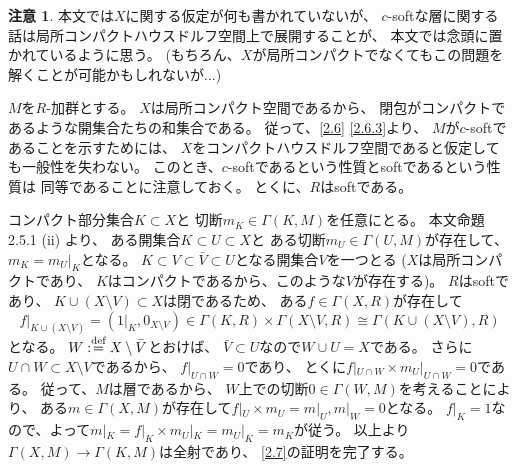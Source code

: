 \documentclass[uplatex,dvipdfmx]{jsarticle}
\makeatletter
\theoremstyle{definition}
\newtheorem*{rem*}{注意}
\renewenvironment{proof}[1][\proofname]{
  \pushQED{\qed}%
  \normalfont \topsep6\p@\@plus6\p@\relax
  \trivlist
  \item[\hskip\labelsep
    #1\@addpunct{\textbf{.}}]\ignorespaces
}{%
  \popQED\endtrivlist\@endpefalse
}
\providecommand{\proofname}{証明}
\def\dfn{:\overset{\mbox{{\scriptsize def}}}{=}}
\makeatother
\begin{document}
\begin{rem*}
  本文では\(X\)に関する仮定が何も書かれていないが、
  \(c\)-softな層に関する話は局所コンパクトハウスドルフ空間上で展開することが、
  本文では念頭に置かれているように思う。
  (もちろん、\(X\)が局所コンパクトでなくてもこの問題を解くことが可能かもしれないが...)
\end{rem*}

\begin{proof}
  \(M\)を\(R\)-加群とする。
  \(X\)は局所コンパクト空間であるから、
  閉包がコンパクトであるような開集合たちの和集合である。
  従って、\autoref{2.6} \ref{2.6.3}より、
  \(M\)が\(c\)-softであることを示すためには、
  \(X\)をコンパクトハウスドルフ空間であると仮定しても一般性を失わない。
  このとき、\(c\)-softであるという性質とsoftであるという性質は
  同等であることに注意しておく。
  とくに、\(R\)はsoftである。

  コンパクト部分集合\(K\subset X\)と
  切断\(m_K\in \Gamma(K,M)\)を任意にとる。
  本文命題2.5.1 (ii) より、
  ある開集合\(K\subset U\subset X\)と
  ある切断\(m_U\in \Gamma(U,M)\)が存在して、
  \(m_K=m_U|_K\)となる。
  \(K\subset V \subset \bar{V}\subset U\)となる開集合\(V\)を一つとる
  (\(X\)は局所コンパクトであり、
  \(K\)はコンパクトであるから、このような\(V\)が存在する)。
  \(R\)はsoftであり、
  \(K\cup (X\setminus V)\subset X\)は閉であるため、
  ある\(f\in \Gamma(X,R)\)が存在して
  \[
  f|_{K\cup (X\setminus V)} = (1|_K,0_{X\setminus V})
  \in \Gamma(K,R) \times \Gamma(X\setminus V,R)
  \cong \Gamma(K\cup (X\setminus V), R)
  \]
  となる。
  \(W\dfn X\setminus \bar{V}\)とおけば、
  \(\bar{V}\subset U\)なので\(W\cup U = X\)である。
  さらに\(U\cap W\subset X\setminus V\)であるから、
  \(f|_{U\cap W} = 0\)であり、
  とくに\(f|_{U\cap W} \times m_U|_{U\cap W} = 0\)である。
  従って、\(M\)は層であるから、
  \(W\)上での切断\(0\in \Gamma(W,M)\)を考えることにより、
  ある\(m\in \Gamma(X,M)\)が存在して\(f|_U\times m_U = m|_U, m|_W=0\)となる。
  \(f|_K=1\)なので、よって\(m|_K = f|_K\times m_U|_K = m_U|_K = m_K\)が従う。
  以上より\(\Gamma(X,M)\to \Gamma(K,M)\)は全射であり、
  \autoref{2.7}の証明を完了する。
\end{proof}
\end{document}
